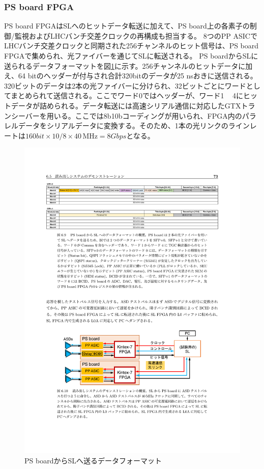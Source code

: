     \subsubsection*{PS board FPGA}
    PS board FPGAはSLへのヒットデータ転送に加えて、PS board上の各素子の制御/監視およびLHCバンチ交差クロックの再構成も担当する。
    8つのPP ASICでLHCバンチ交差クロックと同期された256チャンネルのヒット信号は、PS board FPGAで集められ、光ファイバーを通じてSLに転送される。
    PS boardからSLに送られるデータフォーマットを図\ref{TGC_PSBuplink}に示す。256チャンネルのヒットデータに加え、64 bitのヘッダーが付与され合計320bitのデータが25 nsおきに送信される。320ビットのデータは2本の光ファイバーに分けられ、32ビットごとにワードとしてまとめられて送信される。ここでワード0ではヘッダーが、ワード1 ~ 4にヒットデータが詰められる。データ転送には高速シリアル通信に対応したGTXトランシーバーを用いる。ここでは8b10bコーディングが用いられ、FPGA内のパラレルデータをシリアルデータに変換する。そのため、1本の光リンクのラインレートは$160 bit \times 10/8 \times 40 \mathrm{\,MHz} = 8Gbps$となる。

    \begin{figure} 
    \centering
    \includegraphics[width=16cm]{fig/Intro/TGC_PSBuplink.pdf}
    \caption[PS boardからSLへ送るデータフォーマット]{PS boardからSLへ送るデータフォーマット\cite{mt_aoki}}
    \label{TGC_PSBuplink}
    \end{figure}

